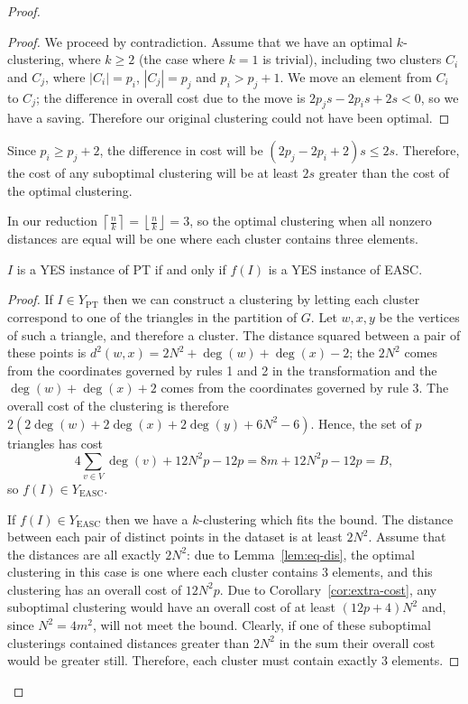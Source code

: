 \begin{proof}
\begin{proof}
    We proceed by contradiction.  Assume that we have an optimal
    $k$-clustering, where $k \geq 2$ (the case where $k=1$ is trivial),
    including two clusters $C_i$ and $C_j$, where $|C_i| = p_i$, $|C_j| = p_j$
    and $p_i > p_j + 1$.  We move an element from $C_i$ to $C_j$; the
    difference in overall cost due to the move is $2p_js - 2p_is + 2s < 0$, so
    we have a saving.  Therefore our original clustering could not have been
    optimal.
  \end{proof}

  \begin{cor}
    \label{cor:extra-cost}
    Since $p_i \geq p_j + 2$, the difference in cost will be $(2p_j - 2p_i +
    2)s \leq 2s$.  Therefore, the cost of any suboptimal clustering will be at
    least $2s$ greater than the cost of the optimal clustering.
  \end{cor}

  In our reduction $\left\lceil \frac{n}{k} \right\rceil = \left\lfloor
    \frac{n}{k} \right\rfloor = 3$, so the optimal clustering when all nonzero
  distances are equal will be one where each cluster contains three elements.

  \begin{lem}
    \label{lem:euclidean-iff}
    $I$ is a YES instance of PT if and only if $f(I)$ is a YES instance of EASC.
  \end{lem}

  \begin{proof}
    If $I \in Y_{\text{PT}}$ then we can construct a clustering by letting
    each cluster correspond to one of the triangles in the partition of $G$.
    Let $w,x,y$ be the vertices of such a triangle, and therefore a cluster.
    The distance squared between a pair of these points is $d^2(w,x) =
    2N^2+\deg(w)+\deg(x)-2$; the $2N^2$ comes from the coordinates governed by
    rules 1 and 2 in the transformation and the $\deg(w) + \deg(x) + 2$ comes
    from the coordinates governed by rule 3.  The overall cost of the
    clustering is therefore $2(2\deg(w)+2\deg(x)+2\deg(y)+6N^2-6)$.  Hence,
    the set of $p$ triangles has cost
    \begin{equation}
      \label{eq:tri-cost}
      4\sum_{v \in V} \deg(v) + 12N^2p - 12p = 8m + 12N^2p - 12p = B,
    \end{equation}
    so $f(I) \in Y_{\text{EASC}}$.

    If $f(I) \in Y_{\text{EASC}}$ then we have a $k$-clustering which fits the
    bound.  The distance between each pair of distinct points in the dataset
    is at least $2N^2$.  Assume that the distances are all exactly $2N^2$: due
    to Lemma~\ref{lem:eq-dis}, the optimal clustering in this case is one
    where each cluster contains 3 elements, and this clustering has an overall
    cost of $12N^2p$.  Due to Corollary~\ref{cor:extra-cost}, any suboptimal
    clustering would have an overall cost of at least $(12p+4)N^2$ and, since
    $N^2=4m^2$, will not meet the bound.  Clearly, if one of these suboptimal
    clusterings contained distances greater than $2N^2$ in the sum their
    overall cost would be greater still.  Therefore, each cluster must contain
    exactly 3 elements.


\end{proof}
\end{proof}
